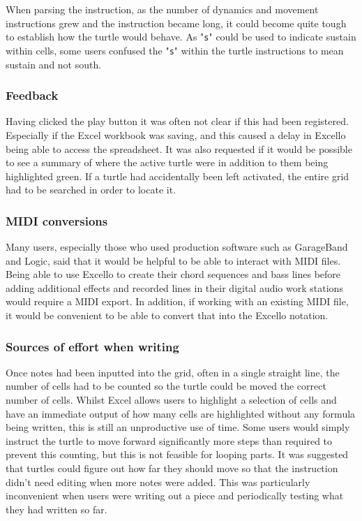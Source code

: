 When parsing the instruction, as the number of dynamics and movement instructions grew and the instruction became long, it could become quite tough to establish how the turtle would behave. As "\texttt{s}" could be used to indicate sustain within cells, some users confused the "\texttt{s}" within the turtle instructions to mean sustain and not south.

\subsubsection{Feedback}

Having clicked the play button it was often not clear if this had been registered. Especially if the Excel workbook was saving, and this caused a delay in Excello being able to access the spreadsheet. It was also requested if it would be possible to see a summary of where the active turtle were in addition to them being highlighted green. If a turtle had accidentally been left activated, the entire grid had to be searched in order to locate it.

\subsubsection{MIDI conversions}

Many users, especially those who used production software such as GarageBand and Logic, said that it would be helpful to be able to interact with MIDI files. Being able to use Excello to create their chord sequences and bass lines before adding additional effects and recorded lines in their digital audio work stations would require a MIDI export. In addition, if working with an existing MIDI file, it would be convenient to be able to convert that into the Excello notation.

\subsubsection{Sources of effort when writing}

Once notes had been inputted into the grid, often in a single straight line, the number of cells had to be counted so the turtle could be moved the correct number of cells. Whilst Excel allows users to highlight a selection of cells and have an immediate output of how many cells are highlighted without any formula being written, this is still an unproductive use of time. Some users would simply instruct the turtle to move forward significantly more steps than required to prevent this counting, but this is not feasible for looping parts. It was suggested that turtles could figure out how far they should move so that the instruction didn't need editing when more notes were added. This was particularly inconvenient when users were writing out a piece and periodically testing what they had written so far.

